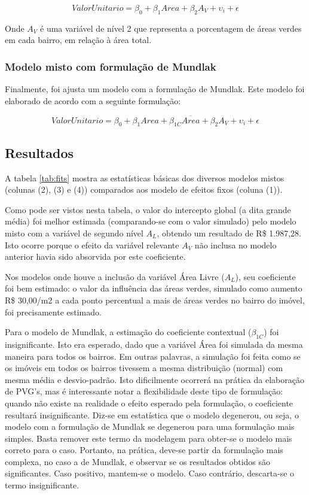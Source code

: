 \documentclass[
  a4paper, 12pt]{article}
\begin{document}
\[ValorUnitario = \beta_0 + \beta_1Area + \beta_2 A_V+ \upsilon_i + \epsilon\]

Onde \(A_V\) é uma variável de nível 2 que representa a porcentagem de
áreas verdes em cada bairro, em relação à área total.

\hypertarget{modelo-misto-com-formulauxe7uxe3o-de-mundlak}{%
\subsubsection{Modelo misto com formulação de
Mundlak}\label{modelo-misto-com-formulauxe7uxe3o-de-mundlak}}

Finalmente, foi ajusta um modelo com a formulação de Mundlak. Este
modelo foi elaborado de acordo com a seguinte formulação:

\[ValorUnitario = \beta_0 + \beta_1 Area + \beta_{1C} \overline{Area}+ \beta_2 A_V+ \upsilon_i + \epsilon\]

\hypertarget{resultados}{%
\subsection{Resultados}\label{resultados}}

A tabela \ref{tab:fits} mostra as estatísticas básicas dos diversos
modelos mistos (colunas (2), (3) e (4)) comparados aos modelo de efeitos
fixos (coluna (1)).

Como pode ser vistos nesta tabela, o valor do intercepto global (a dita
grande média) foi melhor estimada (comparando-se com o valor simulado)
pelo modelo misto com a variável de segundo nível \(A_L\), obtendo um
resultado de R\$ 1.987,28. Isto ocorre porque o efeito da variável
relevante \(A_V\) não inclusa no modelo anterior havia sido absorvida
por este coeficiente.

Nos modelos onde houve a inclusão da variável Área Livre (\(A_L\)), seu
coeficiente foi bem estimado: o valor da influência das áreas verdes,
simulado como aumento R\$ 30,00/m2 a cada ponto percentual a mais de
áreas verdes no bairro do imóvel, foi precisamente estimado.

Para o modelo de Mundlak, a estimação do coeficiente contextual
(\(\beta_{1C}\)) foi insignificante. Isto era esperado, dado que a
variável Área foi simulada da mesma maneira para todos os bairros. Em
outras palavras, a simulação foi feita como se os imóveis em todos os
bairros tivessem a mesma distribuição (normal) com mesma média e
desvio-padrão. Isto dificilmente ocorrerá na prática da elaboração de
PVG's, mas é interessante notar a flexibilidade deste tipo de
formulação: quando não existe na realidade o efeito esperado pela
formulação, o coeficiente resultará insignificante. Diz-se em
estatística que o modelo degenerou, ou seja, o modelo com a formulação
de Mundlak se degenerou para uma formulação mais simples. Basta remover
este termo da modelagem para obter-se o modelo mais correto para o caso.
Portanto, na prática, deve-se partir da formulação mais complexa, no
caso a de Mundlak, e observar se os resultados obtidos são
significantes. Caso positivo, mantem-se o modelo. Caso contrário,
descarta-se o termo insignificante.
\end{document}
